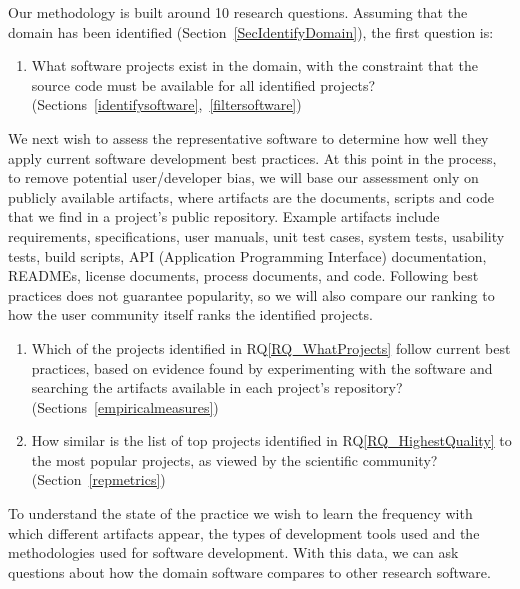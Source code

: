 \documentclass[runningheads]{llncs}
\newcounter{rqnum} %
\newcommand{\rqref}[1]{RQ\ref{#1}}
\begin{document}
Our methodology is built around 10 research questions.  Assuming that the domain
has been identified (Section~\ref{SecIdentifyDomain}), the first question is:

\begin{enumerate}
	\item[RQ\refstepcounter{rqnum}\therqnum \label{RQ_WhatProjects}:] What
	software projects exist in the domain, with the constraint that the source
	code must be available for all identified projects?
	(Sections~\ref{identifysoftware},~\ref{filtersoftware})
\end{enumerate}

We next wish to assess the representative software to determine how well they
apply current software development best practices.  At this point in the
process, to remove potential user/developer bias, we will base our assessment
only on publicly available artifacts, where artifacts are the documents, scripts
and code that we find in a project's public repository. Example artifacts
include requirements, specifications, user manuals, unit test cases, system
tests, usability tests, build scripts, API (Application Programming Interface)
documentation, READMEs, license documents, process documents, and code.
Following best practices does not guarantee popularity, so we will also compare
our ranking to how the user community itself ranks the identified projects.

\begin{enumerate}
	\item [RQ\refstepcounter{rqnum}\therqnum \label{RQ_HighestQuality}:] Which
	of the projects identified in \rqref{RQ_WhatProjects} follow current best
	practices, based on evidence found by experimenting with the software and
	searching the artifacts available in each project's repository? (Sections~\ref{empiricalmeasures})
	\item [RQ\refstepcounter{rqnum}\therqnum \label{RQ_CompareHQ2Popular}:] How
	similar is the list of top projects identified in \rqref{RQ_HighestQuality}
	to the most popular projects, as viewed by the scientific community? (Section~\ref{repmetrics})
\end{enumerate}

To understand the state of the practice we wish to learn the frequency with
which different artifacts appear, the types of development tools used and the
methodologies used for software development.  With this data, we can ask
questions about how the domain software compares to other research software.
\end{document}

